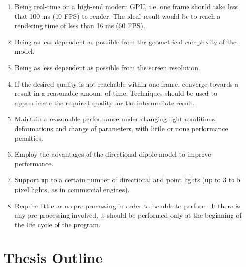 \begin{enumerate}
	\item Being real-time on a high-end modern GPU, i.e. one frame should take less that 100 ms (10 FPS) to render. The ideal result would be to reach a rendering time of less than 16 ms (60 FPS).
	\item Being as less dependent as possible from the geometrical complexity of the model.
	\item Being as less dependent as possible from the screen resolution.
	\item If the desired quality is not reachable within one frame, converge towards a result in a reasonable amount of time. Techniques should be used to approximate the required quality for the intermediate result. 
	\item Maintain a reasonable performance under changing light conditions, deformations and change of parameters, with little or none performance penalties.
	\item Employ the advantages of the directional dipole model to improve performance.
	\item Support up to a certain number of directional and point lights (up to 3 to 5 pixel lights, as in commercial engines\citep{unitymanual}).
	\item Require little or no pre-processing in order to be able to perform. If there is any pre-processing involved, it should be performed only at the beginning of the life cycle of the program. 
\end{enumerate}

%

\section{Thesis Outline}


